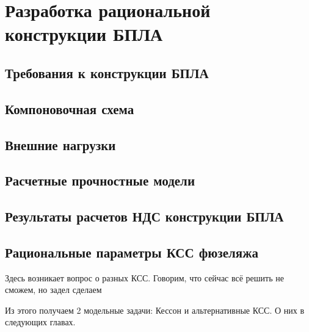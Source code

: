 \chapter{Разработка рациональной конструкции БПЛА}

\section{Требования к конструкции БПЛА}



\section{Компоновочная схема}
	

\section{Внешние нагрузки}



\section{Расчетные прочностные модели}




\section{Результаты расчетов НДС конструкции БПЛА}


\section{Рациональные параметры КСС фюзеляжа}
Здесь возникает вопрос о разных КСС. Говорим, что сейчас всё решить не сможем, но задел сделаем

Из этого получаем 2 модельные задачи: Кессон и альтернативные КСС. О них в следующих главах.